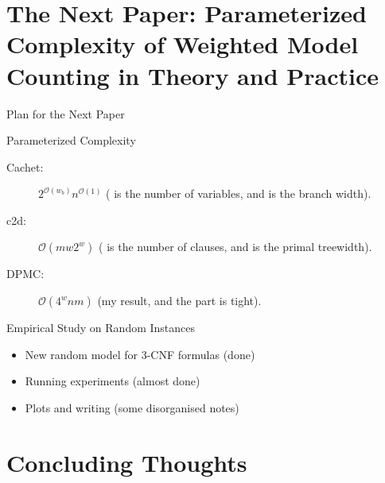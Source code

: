 \documentclass{beamer}
\begin{document}
%   

\section{The Next Paper: Parameterized Complexity of Weighted Model Counting in
  Theory and Practice}

\begin{frame}{Plan for the Next Paper}
  \begin{block}{Parameterized Complexity}
    \begin{description}
    \item[Cachet:] \alert{$2^{\mathcal{O}(w_b)}n^{\mathcal{O}(1)}$}
      ( is the number of variables, and  is the
      branch width).
    \item[c2d:] \alert{$\mathcal{O}(mw2^w)$} ( is the number
      of clauses, and  is the primal treewidth).
    \item[DPMC:] \alert{$\mathcal{O}(4^wnm)$} (my result, and the
       part is tight).
    \end{description}
  \end{block}
  \begin{block}{Empirical Study on Random Instances}
  \begin{itemize}
  \item New random model for 3-CNF formulas (done)
  \item Running experiments (almost done)
  \item Plots and writing (some disorganised notes)
  \end{itemize}
  \end{block}
\end{frame}

\section{Concluding Thoughts}
\end{document}

